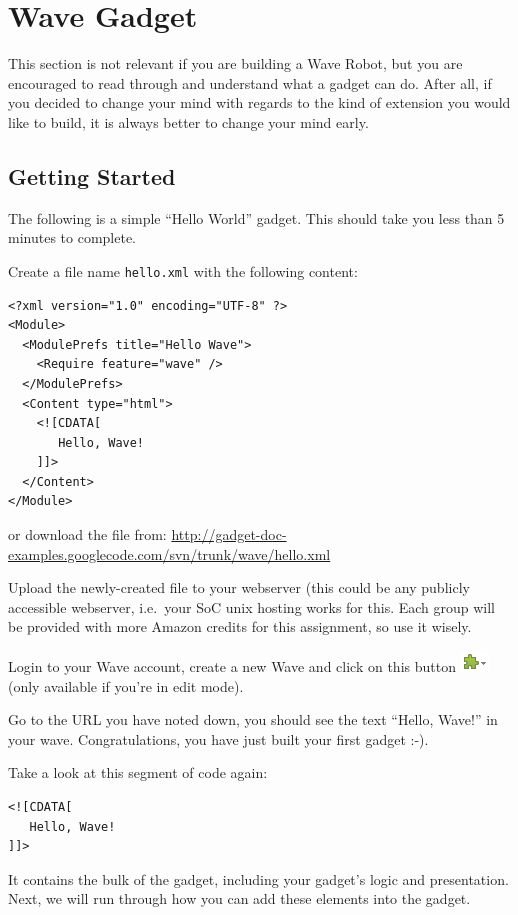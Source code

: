 
\section{Wave Gadget}

This section is not relevant if you are building a Wave Robot, but you
are encouraged to read through and understand what a gadget can
do. After all, if you decided to change your mind with regards to the
kind of extension you would like to build, it is always better to
change your mind early.

\subsection{Getting Started}

The following is a simple ``Hello World'' gadget. This should take you
less than 5 minutes to complete.

Create a file name {\tt hello.xml} with the following content:

\begin{verbatim}
<?xml version="1.0" encoding="UTF-8" ?>
<Module>
  <ModulePrefs title="Hello Wave">
    <Require feature="wave" /> 
  </ModulePrefs>
  <Content type="html">
    <![CDATA[     
       Hello, Wave!
    ]]>
  </Content>
</Module>
\end{verbatim}
or download the file
from: \url{http://gadget-doc-examples.googlecode.com/svn/trunk/wave/hello.xml}

Upload the newly-created file to your webserver (this could be any
publicly accessible webserver, i.e.\ your SoC unix hosting works for
this. Each group will be provided with more Amazon credits for this
assignment, so use it wisely.

Login to your Wave account, create a new Wave and click on this
button \includegraphics{images/insertGadget_icon.png} (only available
if you're in edit mode).

Go to the URL you have noted down, you should see the text ``Hello,
Wave!''  in your wave. Congratulations, you have just built your first
gadget :-).

Take a look at this segment of code again: \begin{verbatim}
<![CDATA[     
   Hello, Wave!
]]>
\end{verbatim}
It contains the bulk of the gadget, including your gadget's logic and
presentation. Next, we will run through how you can add these elements
into the gadget.

